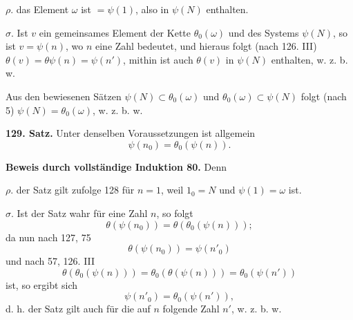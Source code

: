 \documentclass[11pt]{article}
\newcommand{\partof}{\mathrel{\subset}}
\begin{document}
\noindent $\rho.$ das Element $\omega$ ist $=\psi(1)$, also in $\psi(N)$ enthalten.

\noindent $\sigma.$ Ist $v$ ein gemeinsames Element der Kette $\theta_0(\omega)$ und des Systems $\psi(N)$, so ist $v=\psi(n)$, wo $n$ eine Zahl bedeutet, und hieraus folgt (nach 126. III) $\theta(v)=\theta\psi(n)=\psi(n')$, mithin ist auch $\theta(v)$ in $\psi(N)$ enthalten, w. z. b. w.

Aus den bewiesenen Sätzen $\psi(N)\partof\theta_0(\omega)$ und $\theta_0(\omega)\partof\psi(N)$ folgt (nach 5) $\psi(N)=\theta_0(\omega)$, w. z. b. w.

\noindent\textbf{129. Satz.} Unter denselben Voraussetzungen ist allgemein
\[
\psi(n_0)=\theta_0(\psi(n)).
\]

\noindent\textbf{Beweis durch vollständige Induktion 80.} Denn

\noindent $\rho.$ der Satz gilt zufolge 128 für $n=1$, weil $1_0=N$ und $\psi(1)=\omega$ ist.

\noindent $\sigma.$ Ist der Satz wahr für eine Zahl $n$, so folgt
\[
\theta(\psi(n_0))=\theta(\theta_0(\psi(n)));
\]
da nun nach 127, 75
\[
\theta(\psi(n_0))=\psi(n'_0)
\]
und nach 57, 126. III
\[
\theta(\theta_0(\psi(n)))=\theta_0(\theta(\psi(n)))=\theta_0(\psi(n'))
\]
ist, so ergibt sich
\[
\psi(n'_0)=\theta_0(\psi(n')),
\]
d. h. der Satz gilt auch für die auf $n$ folgende Zahl $n'$, w. z. b. w.
\end{document}
